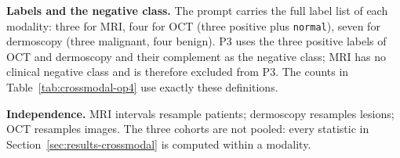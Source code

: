 \textbf{Labels and the negative class.} The prompt carries the full label list of each
modality: three for MRI, four for OCT (three positive plus \texttt{normal}), seven for
dermoscopy (three malignant, four benign). P3 uses the three positive labels of OCT and
dermoscopy and their complement as the negative class; MRI has no clinical negative class
and is therefore excluded from P3. The counts in Table~\ref{tab:crossmodal-op4} use exactly
these definitions.

\textbf{Independence.} MRI intervals resample patients; dermoscopy resamples lesions; OCT
resamples images. The three cohorts are not pooled: every statistic in
Section~\ref{sec:results-crossmodal} is computed within a modality.